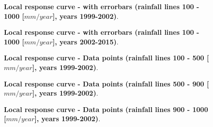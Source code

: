 \documentclass[aps,pre,twocolumn]{revtex4-1}
\begin{document}
\begin{figure}[H]
	
	
	\vspace{1.0pt}
	
	\caption{\textbf{Local response curve - with errorbars (rainfall lines 100 - 1000 [$mm/year$], years 1999-2002)}.}
\end{figure}


\begin{figure}[H]
	
	
	\vspace{1.0pt}
	
	\caption{\textbf{Local response curve - with errorbars (rainfall lines 100 - 1000 [$mm/year$], years 2002-2015)}.}
\end{figure}

\begin{figure}[H]
	
	
	\vspace{1.0pt}
	
	\caption{\textbf{Local response curve - Data points (rainfall lines 100 - 500 [$mm/year$], years 1999-2002)}.}
\end{figure}

\begin{figure}[H]
	

	\vspace{1.0pt}
	
	\caption{\textbf{Local response curve - Data points (rainfall lines 500 - 900 [$mm/year$], years 1999-2002)}.}
\end{figure}

\newpage
\pagebreak

\begin{figure}[H]
	
	
	\caption{\textbf{Local response curve - Data points (rainfall lines 900 - 1000 [$mm/year$], years 1999-2002)}.}
\end{figure}
\end{document}
